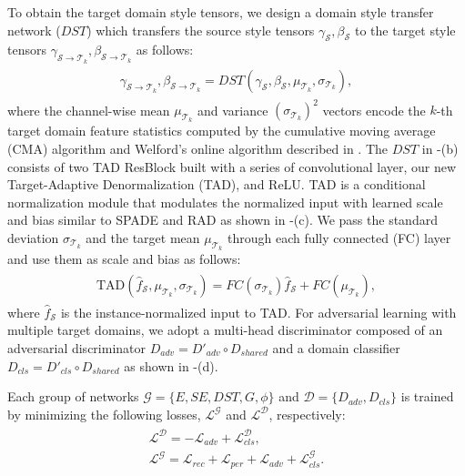 To obtain the target domain style tensors, we design a domain style transfer network ($DST$) which transfers the source style tensors $\gamma_\mathcal{S}, \beta_\mathcal{S}$ to the target style tensors $\gamma_{\mathcal{S}\to \mathcal{T}_k}, \beta_{\mathcal{S}\to \mathcal{T}_k}$ as follows:
\begin{gather}
\begin{split}
\gamma_{\mathcal{S}\to{\mathcal{T}_k}}, \beta_{\mathcal{S}\to{\mathcal{T}_k}} = DST(\gamma_\mathcal{S},\beta_\mathcal{S}, \mu_{\mathcal{T}_k}, \sigma_{\mathcal{T}_k}),
\end{split}
\label{eq:DST}
\end{gather}
where the channel-wise mean $\mu_{\mathcal{T}_k}$ and variance $(\sigma_{\mathcal{T}_k})^2$ vectors encode the $k$-th target domain feature statistics computed by the cumulative moving average (CMA) algorithm and Welford's online algorithm \cite{welford1962note} described in .
The $DST$ in -(b) consists of two TAD ResBlock built with a series of convolutional layer, our new Target-Adaptive Denormalization (TAD), and ReLU.
TAD is a conditional normalization module that modulates the normalized input with learned scale and bias similar to SPADE\cite{park2019semantic} and RAD\cite{richter2021enhancing} as shown in -(c).
We pass the standard deviation $\sigma_{\mathcal{T}_k}$ and the target mean $\mu_{\mathcal{T}_k}$ through each fully connected (FC) layer and use them as scale and bias as follows:
\begin{gather}
\begin{split}
\text{TAD}(\hat{f}_\mathcal{S}, \mu_{\mathcal{T}_k}, \sigma_{\mathcal{T}_k}) = FC(\sigma_{\mathcal{T}_k})\hat{f}_\mathcal{S} + FC(\mu_{\mathcal{T}_k}),
\end{split}
\label{eq:TAD}
\end{gather}
where $\hat{f}_\mathcal{S}$ is the instance-normalized \cite{ulyanov2016instance} input to TAD.
For adversarial learning with multiple target domains, we adopt a multi-head discriminator composed of an adversarial discriminator $D_{adv}=D'_{adv}\circ D_{shared}$ and a domain classifier $D_{cls}=D'_{cls}\circ D_{shared}$ as shown in -(d). 


Each group of networks $\mathcal{G}=\{ E, SE, DST, G, \phi \}$ and $\mathcal{D}=\{ D_{adv}, D_{cls} \}$ is trained by minimizing the following losses, $\mathcal{L}^{\mathcal{G}}$ and $\mathcal{L}^{\mathcal{D}}$, respectively:
\begin{gather}
\begin{split}
    \mathcal{L}^{\mathcal{D}} = -\mathcal{L}_{adv} + \mathcal{L}_{cls}^{\mathcal{D}},\\
    \mathcal{L}^{\mathcal{G}} = \mathcal{L}_{rec} + \mathcal{L}_{per} + \mathcal{L}_{adv} + \mathcal{L}_{cls}^{\mathcal{G}}.
\end{split}
\label{eq:full_obj}
\end{gather}

